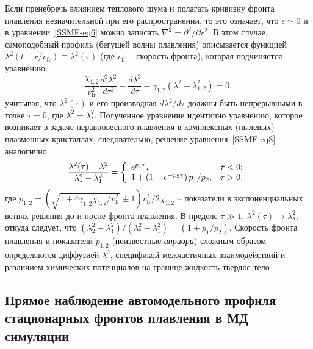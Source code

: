 Если пренебречь влиянием теплового шума и полагать кривизну фронта плавления незначительной при его распространении, то это означает, что $ \epsilon \simeq 0 $ и в уравнении~\eqref{SSMF-eq6} можно записать $ \nabla ^ 2 = \partial ^ 2 / \partial r ^ 2 $.
В этом случае, самоподобный профиль (бегущей волны плавления) описывается функцией $\lambda^2(t-r/v_\mathrm{fr})\equiv \lambda^2(\tau)$ (где $v_\mathrm{fr}$ -- скорость фронта), которая подчиняется уравнению:
\begin{equation}
  \label{SSMF-eq8}
  \frac{\chi_{1,2}}{v_{\mathrm{fr}}^2} \frac{d^2 \lambda^2}{d\tau^2} -\frac{d \lambda^2}{d \tau} -\gamma_{1,2}(\lambda^2-\lambda_{1,2}^2) =0,
\end{equation}
учитывая, что $\lambda^2(\tau) $ и его производная $ d\lambda^2/ d \tau $ должны быть непрерывными в точке $ \tau = 0 $, где $\lambda^2=\lambda_\ast^2$.
Полученное уравнение идентично уравнению, которое возникает в задаче неравновесного плавления в комплексных (пылевых) плазменных кристаллах, следовательно, решение уравнения~\eqref{SSMF-eq8} аналогично \cite{10.1103/physreve.96.043201, 10.1103/physreve.100.023203}:
\begin{equation}
  \label{SSMF-eq9}
  \frac{\lambda^2(\tau)-\lambda^2_1}{\lambda^2_\ast-\lambda^2_1}=
  \left\{
    \begin{array}{ll}
      e^{p_1 \tau}, & \tau < 0;\\
      1+\left(1-e^{-p_2\tau}\right)p_1/p_2 , & \tau > 0,\\
    \end{array}
  \right. \\
\end{equation}
где $ p_{1,2} = \left(\sqrt {1 + 4 \gamma_{1,2} \chi_{1,2} / v_\mathrm{fr} ^ 2} \pm 1 \right) v_\mathrm{fr} ^ 2/2 \chi_{1,2} $ -- показатели в экспоненциальных ветвях решения до и после фронта плавления.
В пределе $\tau \gg 1$, $\lambda^2(\tau) \rightarrow \lambda_2^2$, откуда следует, что
$\left(\lambda_2^2-\lambda^2_1\right)/\left(\lambda^2_\ast-\lambda^2_1\right) = (1+p_1/p_2)$.
Скорость фронта плавления и показатели $p_{1,2} $ (неизвестные \emph{априори}) сложным образом определяются диффузией $\lambda^2$, спецификой межчастичных взаимодействий и различием химических потенциалов на границе жидкость-твердое тело~\cite{10.1038/ncomms7942}.


\subsection{Прямое наблюдение автомодельного профиля стационарных фронтов плавления в МД симуляции}
\label{SSMF-Results-MD}

